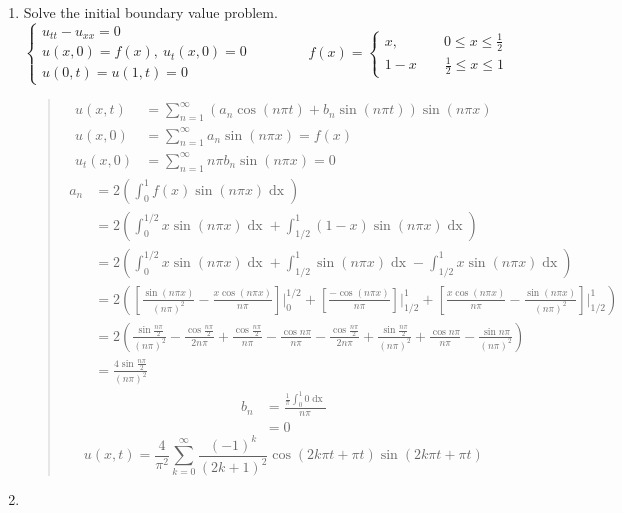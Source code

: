 \documentclass{article}
\newcommand{\beq}{\begin{quote}}
\newcommand{\eeq}{\end{quote}}
\newcommand{\dx}{\mathop{dx}}
\begin{document}
\begin{enumerate}
\item Solve the initial boundary value problem.
\[
\begin{cases*}
u_{tt} - u_{xx} = 0\\
u(x,0) = f(x),\ u_{t}(x,0) = 0\\
u(0,t) = u(1,t) = 0
\end{cases*}
\qquad\qquad
f(x) =
\begin{cases*}
x,\qquad\quad\ 0\leq x\leq\frac{1}{2}\\
1- x\qquad \frac{1}{2}\leq x\leq 1
\end{cases*}
\]
\beq
\begin{align*}
u(x,t) &= \sum_{n=1}^{\infty}(a_{n}\cos{(n\pi t)} + b_{n}\sin{(n\pi t)})\sin{(n\pi x)}\\
u(x,0) &= \sum_{n=1}^{\infty}a_{n}\sin{(n\pi x)} = f(x)\\
u_{t}(x,0) &= \sum_{n=1}^{\infty}n\pi b_{n}\sin{(n\pi x)} = 0
\end{align*}
\begin{align*}
a_{n} &= 2\left(\int_{0}^{1}f(x)\sin{(n\pi x)}\dx\right)\\
&= 2\left(\int_{0}^{1/2}x\sin{(n\pi x)}\dx + \int_{1/2}^{1}(1-x)\sin{(n\pi x)}\dx\right)\\
&= 2\left(\int_{0}^{1/2}x\sin{(n\pi x)}\dx + \int_{1/2}^{1}\sin{(n\pi x)}\dx - \int_{1/2}^{1}x\sin{(n\pi x)}\dx\right)\\
&= 2\left(\left[\frac{\sin{(n\pi x)}}{(n\pi)^{2}} - \frac{x\cos{(n\pi x)}}{n\pi}\right]\Bigg|_{0}^{1/2} + \left[ \frac{-\cos{(n\pi x)}}{n\pi}\right]\Bigg|_{1/2}^{1} + \left[\frac{x\cos{(n\pi x)}}{n\pi} - \frac{\sin{(n\pi x)}}{(n\pi)^2}\right]\Bigg|_{1/2}^{1}\right)\\
&= 2\left(\frac{\sin{\frac{n\pi}{2}}}{(n\pi)^2} - \frac{\cos{\frac{n\pi}{2}}}{2n\pi} + \frac{\cos{\frac{n\pi}{2}}}{n\pi} - \frac{\cos{n\pi}}{n\pi} - \frac{\cos{\frac{n\pi}{2}}}{2n\pi} + \frac{\sin{\frac{n\pi}{2}}}{(n\pi)^{2}} + \frac{\cos{n\pi}}{n\pi} - \frac{\sin{n\pi}}{(n\pi)^{2}}\right)\\
&= \frac{4\sin{\frac{n\pi}{2}}}{(n\pi)^{2}}
\end{align*}
\begin{align*}
b_{n} &= \frac{\frac{1}{\pi}\int_{0}^{1}0\dx}{n\pi}\\
&= 0
\end{align*}
\[
u(x,t) = \frac{4}{\pi^{2}}\sum_{k=0}^{\infty}\frac{(-1)^{k}}{(2k+1)^{2}}\cos{(2k\pi t + \pi t)}\sin{(2k\pi t + \pi t)}
\]
\eeq
\item
\end{enumerate}
\end{document}
